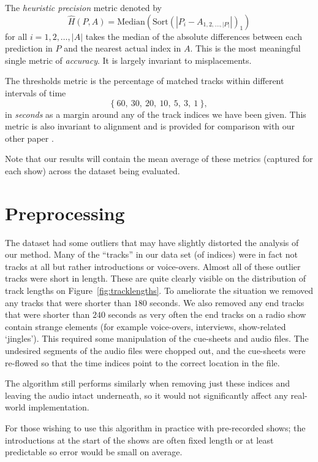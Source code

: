 \documentclass[twocolumn]{article}
\begin{document}
	The \textit{heuristic precision} metric denoted by 
	\[
	\hat H(P,A) =  \mathrm{Median}\left(    \mathrm{Sort}\left( |P_i-A_{1,2,\ldots,|P|}|\right)_1 \right)
	\] for all $i=1,2,\ldots,|A|$
	takes the median of the absolute differences between each prediction in $P$ and the nearest actual index in $A$. This is the most meaningful single metric of \textit{accuracy}. It is largely invariant to misplacements.
	
	The thresholds metric is the percentage of matched tracks within different intervals of time \[\{~60, ~30, ~20, ~10, ~5, ~3, ~1~\},\] in \emph{seconds} as a margin around any of the track indices we have been given. This metric is also invariant to alignment and is provided for comparison with our other paper \cite{scarfe2013long}.
	
	Note that our results will contain the mean average of these metrics (captured for each show) across the dataset being evaluated. 
	
	\section{Preprocessing}\label{proprocessing} %
	
	The dataset had some outliers that may have slightly distorted the analysis of our method. Many of the ``tracks'' in our data set (of indices) were in fact not tracks at all but rather introductions or voice-overs. Almost all of these outlier tracks were short in length. These are quite clearly visible on the distribution of track lengths on Figure~\ref{fig:tracklengths}. To ameliorate the situation we removed any tracks that were shorter than $180$ seconds. We also removed any end tracks that were shorter than $240$ seconds as very often the end tracks on a radio show contain strange elements (for example voice-overs, interviews, show-related `jingles'). This required some manipulation of the cue-sheets and audio files. The undesired segments of the audio files were chopped out, and the cue-sheets were re-flowed so that the time indices point to the correct location in the file. 
	
	The algorithm still performs similarly when removing just these indices and leaving the audio intact underneath, so it would not significantly affect any real-world implementation. 
	
	For those wishing to use this algorithm in practice with pre-recorded shows; the introductions at the start of the shows are often fixed length or at least predictable so error would be small on average.
	
\end{document}

